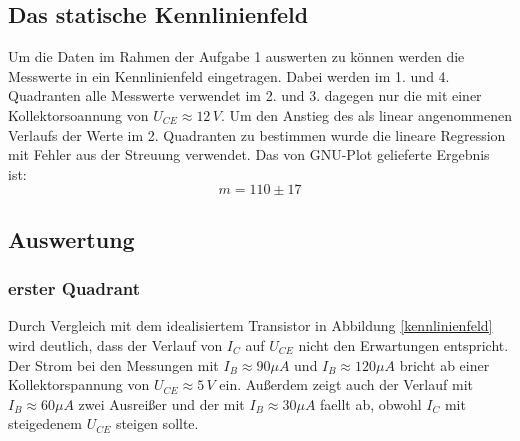 \subsection{Das statische Kennlinienfeld}
Um die Daten im Rahmen der Aufgabe 1 auswerten zu können werden die Messwerte in ein Kennlinienfeld eingetragen. Dabei werden im 1. und 4. Quadranten alle Messwerte verwendet im 2. und 3. dagegen nur die mit einer Kollektorsoannung von \(U_{CE} \approx 12\,V \). Um den Anstieg des als linear angenommenen Verlaufs der Werte im 2. Quadranten zu bestimmen wurde die lineare Regression mit Fehler aus der Streuung verwendet. Das von GNU-Plot gelieferte Ergebnis ist:
\begin{equation}
m = 110 \pm 17
\end{equation}
\begin{center}
\begin{minipage}{\linewidth}
\centering
{}
%
\label{gnuplot_kennlinienfeld}
\end{minipage}
\end{center}
\subsection{Auswertung}
\subsubsection{erster Quadrant}
Durch Vergleich mit dem idealisiertem Transistor in Abbildung \ref{kennlinienfeld} wird deutlich, dass der Verlauf von \(I_C\) auf \(U_{CE}\) nicht den Erwartungen entspricht. Der Strom bei den Messungen mit \(I_B \approx 90 \mu A\) und \(I_B \approx 120 \mu A\) bricht ab einer Kollektorspannung von \(U_{CE} \approx 5\, V\) ein. Außerdem zeigt auch der Verlauf mit \(I_B \approx 60 \mu A\) zwei Ausreißer und der mit \(I_B \approx 30 \mu A\) faellt ab, obwohl \(I_C\) mit steigedenem \(U_{CE}\) steigen sollte.
